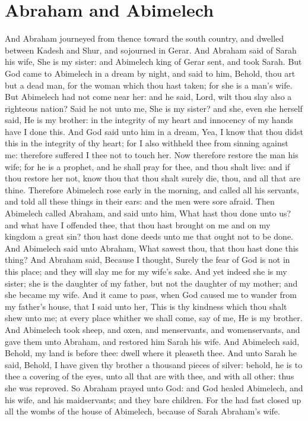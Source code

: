 \section*{Abraham and Abimelech}
\begin{biblechapter} %
\verse And Abraham journeyed from thence toward the south country, and dwelled between Kadesh and Shur, and sojourned in Gerar.
\verse And Abraham said of Sarah his wife, She is my sister: and Abimelech king of Gerar sent, and took Sarah.
\verse But God came to Abimelech in a dream by night, and said to him, Behold, thou art but a dead man, for the woman which thou hast taken; for she is a man's wife.
\verse But Abimelech had not come near her: and he said, Lord, wilt thou slay also a righteous nation?
\verse Said he not unto me, She is my sister? and she, even she herself said, He is my brother: in the integrity of my heart and innocency of my hands have I done this.
\verse And God said unto him in a dream, Yea, I know that thou didst this in the integrity of thy heart; for I also withheld thee from sinning against me: therefore suffered I thee not to touch her.
\verse Now therefore restore the man his wife; for he is a prophet, and he shall pray for thee, and thou shalt live: and if thou restore her not, know thou that thou shalt surely die, thou, and all that are thine.
\verse Therefore Abimelech rose early in the morning, and called all his servants, and told all these things in their ears: and the men were sore afraid.
\verse Then Abimelech called Abraham, and said unto him, What hast thou done unto us? and what have I offended thee, that thou hast brought on me and on my kingdom a great sin? thou hast done deeds unto me that ought not to be done.
\verse And Abimelech said unto Abraham, What sawest thou, that thou hast done this thing?
\verse And Abraham said, Because I thought, Surely the fear of God is not in this place; and they will slay me for my wife's sake.
\verse And yet indeed she is my sister; she is the daughter of my father, but not the daughter of my mother; and she became my wife.
\verse And it came to pass, when God caused me to wander from my father's house, that I said unto her, This is thy kindness which thou shalt shew unto me; at every place whither we shall come, say of me, He is my brother.
\verse And Abimelech took sheep, and oxen, and menservants, and womenservants, and gave them unto Abraham, and restored him Sarah his wife.
\verse And Abimelech said, Behold, my land is before thee: dwell where it pleaseth thee.
\verse And unto Sarah he said, Behold, I have given thy brother a thousand pieces of silver: behold, he is to thee a covering of the eyes, unto all that are with thee, and with all other: thus she was reproved.
\verse So Abraham prayed unto God: and God healed Abimelech, and his wife, and his maidservants; and they bare children.
\verse For the \LORD had fast closed up all the wombs of the house of Abimelech, because of Sarah Abraham's wife.
\end{biblechapter}

